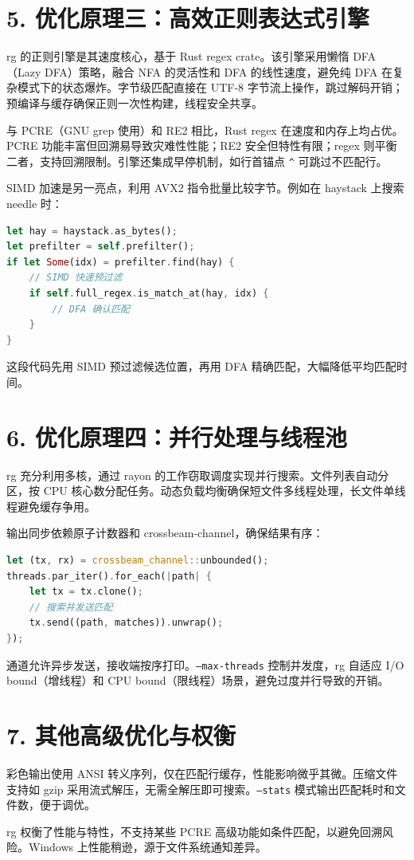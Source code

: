 \chapter{5. 优化原理三：高效正则表达式引擎}
rg 的正则引擎是其速度核心，基于 Rust regex crate。该引擎采用懒惰 DFA（Lazy DFA）策略，融合 NFA 的灵活性和 DFA 的线性速度，避免纯 DFA 在复杂模式下的状态爆炸。字节级匹配直接在 UTF-8 字节流上操作，跳过解码开销；预编译与缓存确保正则一次性构建，线程安全共享。\par
与 PCRE（GNU grep 使用）和 RE2 相比，Rust regex 在速度和内存上均占优。PCRE 功能丰富但回溯易导致灾难性性能；RE2 安全但特性有限；regex 则平衡二者，支持回溯限制。引擎还集成早停机制，如行首锚点 \texttt{\^{}} 可跳过不匹配行。\par
SIMD 加速是另一亮点，利用 AVX2 指令批量比较字节。例如在 haystack 上搜索 needle 时：\par
\begin{lstlisting}[language=rust]
let hay = haystack.as_bytes();
let prefilter = self.prefilter();
if let Some(idx) = prefilter.find(hay) {
    // SIMD 快速预过滤
    if self.full_regex.is_match_at(hay, idx) {
        // DFA 确认匹配
    }
}
\end{lstlisting}
这段代码先用 SIMD 预过滤候选位置，再用 DFA 精确匹配，大幅降低平均匹配时间。\par
\chapter{6. 优化原理四：并行处理与线程池}
rg 充分利用多核，通过 rayon 的工作窃取调度实现并行搜索。文件列表自动分区，按 CPU 核心数分配任务。动态负载均衡确保短文件多线程处理，长文件单线程避免缓存争用。\par
输出同步依赖原子计数器和 crossbeam-channel，确保结果有序：\par
\begin{lstlisting}[language=rust]
let (tx, rx) = crossbeam_channel::unbounded();
threads.par_iter().for_each(|path| {
    let tx = tx.clone();
    // 搜索并发送匹配
    tx.send((path, matches)).unwrap();
});
\end{lstlisting}
通道允许异步发送，接收端按序打印。\texttt{--max-threads} 控制并发度，rg 自适应 I/O bound（增线程）和 CPU bound（限线程）场景，避免过度并行导致的开销。\par
\chapter{7. 其他高级优化与权衡}
彩色输出使用 ANSI 转义序列，仅在匹配行缓存，性能影响微乎其微。压缩文件支持如 gzip 采用流式解压，无需全解压即可搜索。\texttt{--stats} 模式输出匹配耗时和文件数，便于调优。\par
rg 权衡了性能与特性，不支持某些 PCRE 高级功能如条件匹配，以避免回溯风险。Windows 上性能稍逊，源于文件系统通知差异。\par
